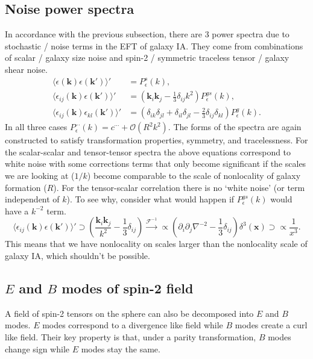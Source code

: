 \documentclass[11pt]{book}
\newcommand{\br}[1]{\ensuremath{\left( #1 \right)}}
\begin{document}
\subsection{Noise power spectra}
\label{sec:noisepowerspectragalaxyIA}
In accordance with the previous subsection, there are 3 power spectra due to stochastic / noise terms in the EFT of galaxy IA. They come from combinations of scalar / galaxy size noise and spin-2 / symmetric traceless tensor / galaxy shear noise.
\begin{align}
    \langle \epsilon(\mathbf k)\epsilon(\mathbf k') \rangle' &= P^s_\epsilon(k), \\
    \langle \epsilon_{ij}(\mathbf k)\epsilon(\mathbf k') \rangle' &= (\mathbf k_i \mathbf k_j - \frac{1}{3} \delta_{ij}k^2)P^{gs}_\epsilon(k), \\
    \langle \epsilon_{ij}(\mathbf k)\epsilon_{kl}(\mathbf k') \rangle' &= (\delta_{ik}\delta_{jl}+\delta_{il}\delta_{jl}-\frac{2}{3}\delta_{ij}\delta_{kl})P^g_\epsilon(k) .
\end{align}
In all three cases $P_{\epsilon}^{\cdots}(k) = c^{\cdots} + \mathcal O(R^2k^2)$. The forms of the spectra are again constructed to satisfy transformation properties, symmetry, and tracelessness. For the scalar-scalar and tensor-tensor spectra the above equations correspond to white noise with some corrections terms that only become significant if the scales we are looking at ($1/k$) become comparable to the scale of nonlocality of galaxy formation ($R$). For the tensor-scalar correlation there is no `white noise' (or term independent of $k$). To see why, consider what would happen if $P^{gs}_\epsilon(k)$ would have a $k^{-2}$ term.
\begin{equation}
    \langle \epsilon_{ij}(\mathbf k)\epsilon(\mathbf k') \rangle' \supset \br{ \frac{\mathbf k_i\mathbf k_j}{k^2} - \frac{1}{3}\delta_{ij}} \xrightarrow{\mathcal F^{-1}}\propto (\partial_i\partial_j\nabla^{-2} - \frac{1}{3}\delta_{ij})\delta^{3}(\mathbf x) \supset \propto \frac{1}{x^3}.
\end{equation}
This means that we have nonlocality on scales larger than the nonlocality scale of galaxy IA, which shouldn't be possible.

\subsection{$E$ and $B$ modes of spin-2 field}
A field of spin-2 tensors on the sphere can also be decomposed into $E$ and $B$ modes. $E$ modes correspond to a divergence like field while $B$ modes create a curl like field. Their key property is that, under a parity transformation, $B$ modes change sign while $E$ modes stay the same.
\end{document}
